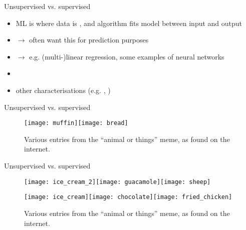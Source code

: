 \documentclass[xcolor=x11names,compress]{beamer}
\renewcommand{\(}{\begin{columns}}
\renewcommand{\)}{\end{columns}}
\newcommand{\<}[1]{\begin{column}{#1}}
\renewcommand{\>}{\end{column}}
\begin{document}
\begin{frame}{Unsupervised vs. supervised}

\begin{itemize}
  \item {} ML is where data is , and
  algorithm fits model between input and output
  \item[] $\to$ often want this for prediction purposes
  \item[] $\to$ e.g. (multi-)linear regression, some examples of neural networks
  \item[]
  \item other characterisations (e.g. ,
  )
\end{itemize}

\end{frame}


\begin{frame}{Unsupervised vs. supervised}

\begin{figure}
  \texttt{[image: muffin]}\hspace*{1mm}\texttt{[image: bread]}
  \caption{Various entries from the ``animal or things'' meme, as found on the
  internet.}
\end{figure}

\end{frame}


\begin{frame}{Unsupervised vs. supervised}

\begin{figure}
  \texttt{[image: ice\_cream\_2]}\texttt{[image: guacamole]}\texttt{[image: sheep]}
  
  \texttt{[image: ice\_cream]}\texttt{[image: chocolate]}\texttt{[image: fried\_chicken]}
  \caption{Various entries from the ``animal or things'' meme, as found on the
  internet.}
\end{figure}

\end{frame}

\end{document}
